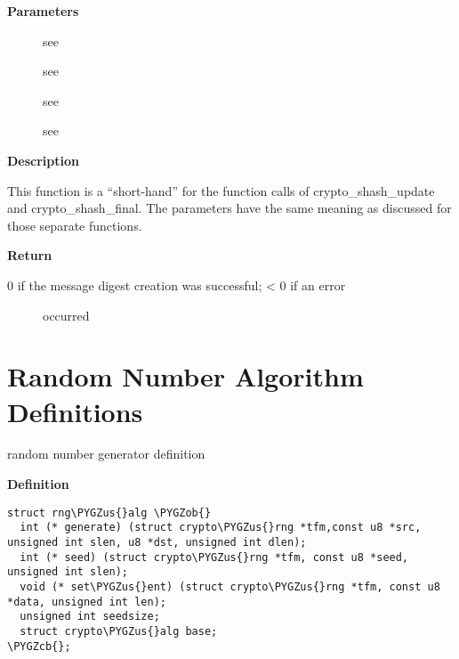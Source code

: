 \documentclass[a4paper,8pt,english]{sphinxmanual}
\def\PYGZus{\char`\_}
\def\PYGZob{\char`\{}
\def\PYGZcb{\char`\}}
\begin{document}
\textbf{Parameters}
\begin{description}
\item[{}] \leavevmode
see {\hyperref[crypto/api\string-digest:c.crypto_shash_final]{}}

\item[{}] \leavevmode
see {\hyperref[crypto/api\string-digest:c.crypto_shash_update]{}}

\item[{}] \leavevmode
see {\hyperref[crypto/api\string-digest:c.crypto_shash_update]{}}

\item[{}] \leavevmode
see {\hyperref[crypto/api\string-digest:c.crypto_shash_final]{}}

\end{description}

\textbf{Description}

This function is a ``short-hand'' for the function calls of
crypto\_shash\_update and crypto\_shash\_final. The parameters have the same
meaning as discussed for those separate functions.

\textbf{Return}
\begin{description}
\item[{0 if the message digest creation was successful; \textless{} 0 if an error}] \leavevmode
occurred

\end{description}


\section{Random Number Algorithm Definitions}
\label{crypto/api-rng::doc}\label{crypto/api-rng:random-number-algorithm-definitions}

\begin{fulllineitems}
\label{crypto/api-rng:c.rng_alg}
random number generator definition

\end{fulllineitems}


\textbf{Definition}

\begin{Verbatim}[commandchars=\\\{\}]
struct rng\PYGZus{}alg \PYGZob{}
  int (* generate) (struct crypto\PYGZus{}rng *tfm,const u8 *src, unsigned int slen, u8 *dst, unsigned int dlen);
  int (* seed) (struct crypto\PYGZus{}rng *tfm, const u8 *seed, unsigned int slen);
  void (* set\PYGZus{}ent) (struct crypto\PYGZus{}rng *tfm, const u8 *data, unsigned int len);
  unsigned int seedsize;
  struct crypto\PYGZus{}alg base;
\PYGZcb{};
\end{Verbatim}
\end{document}
